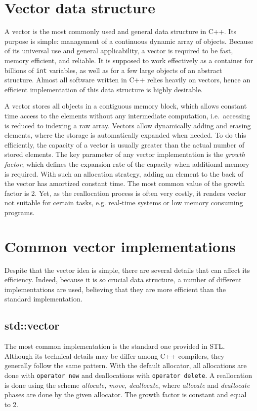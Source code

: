 \documentclass[inz, english, shortabstract]{iithesis}
\begin{document}


\chapter{Vector data structure}

A vector is the most commonly used and general data structure in C++. Its purpose is simple: management of a continuous dynamic array of objects. Because of its universal use and general applicability, a vector is required to be fast, memory efficient, and reliable. It is supposed to work effectively as a container for billions of {\tt int} variables, as well as for a few large objects of an abstract structure. Almost all software written in C++ relies heavily on vectors, hence an efficient implementation of this data structure is highly desirable.

A vector stores all objects in a contiguous memory block, which allows constant time access to the elements without any intermediate computation, i.e.\ accessing is reduced to indexing a raw array. Vectors allow dynamically adding and erasing elements, where the storage is automatically expanded when needed. To do this efficiently, the capacity of a vector is usually greater than the actual number of stored elements. The key parameter of any vector implementation is the \emph{growth factor}, which defines the expansion rate of the capacity when additional memory is required. With such an allocation strategy, adding an element to the back of the vector has amortized constant time. The most common value of the growth factor is 2. Yet, as the reallocation process is often very costly, it renders vector not suitable for certain tasks, e.g. real-time systems or low memory consuming programs.


\chapter{Common vector implementations}

Despite that the vector idea is simple, there are several details that can affect its efficiency.
Indeed, because it is so crucial data structure, a number of different implementations are used, believing that they are more efficient than the standard implementation.

\section{std::vector}
The most common implementation is the standard one provided in STL.
Although its technical details may be differ among C++ compilers, they generally follow the same pattern.
With the default allocator, all allocations are done with {\tt operator new} and deallocations with {\tt operator delete}. A reallocation is done using the scheme \emph{allocate, move, deallocate}, where \emph{allocate} and \emph{deallocate} phases are done by the given allocator. The growth factor is constant and equal to 2.
\end{document}
